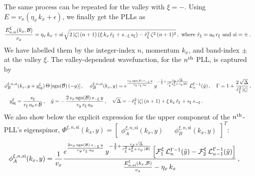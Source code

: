 \documentclass[aps,prb, onecolumn, nofootinbib, citeautoscript,10pt]{revtex4-2}
\def \nn{\nonumber \\}
\begin{document}
\begin{widetext}
The same process can be repeated for the valley with $\xi =- $. Using $E= v_x \left (  \eta_x \,   k_x + \epsilon   \right ) $, we finally get the PLLs as
\begin{align}
\frac{  E^{\xi}_{n, \rm{si}} (k_x, \mathcal B) } {v_x} =  
\eta_x \,   k_x + \text{si} \,\sqrt{ 2\,|\zeta|\,(n+1) \left (\xi\,k_x \, \tilde r_\xi + s_{-\xi} \, s_\xi \right ) - \tilde r_\xi^2 \, \zeta^2\,(n+1)^2 }  \,,
\text{ where } \tilde{r}_\xi = a_0 \, r_\xi \text{ and } \text{si} =\pm\,.
\end{align}
We have labelled them by the integer-index $n$, momentum $k_x$, and band-index $\pm$ at the valley $\xi$. The valley-dependent wavefunction, for the $n^{\rm th}$ PLL, is captured by
\begin{align}
& \phi_B^{\xi,n, \text{si}} (k_x, y+ y^\xi_{\rm sg}) \, \Theta \left[ \text{sgn}(\mathcal B ) \left(- y\right)  \right],\,
\quad
 \phi_B^{\xi, n, \text{si}} (k_x, y) = e^{\frac{ v_x \, \text{sgn} (\mathcal B) \,s_{- \xi}\, y} { v_y \, r_\xi\, a_0 }} \, 
y^{-\frac{1}{2}+{\frac{ v_x \,\sqrt{\Delta}}{ r_\xi^2\, a_0^2\, e  \, v_y  \left |{\mathcal B}  \right |}}} \, 
{\mathcal L}^{\Gamma-1}_{n}(\tilde y)\,, 
\quad  \Gamma = 1+ \frac{2 \,\sqrt{\Delta }}{\tilde  r_\xi^2 \, |\zeta|} \,,\nn
& \quad  y^\xi_{\rm sg} = \frac{s_\xi } {r_\xi \,a_0\,  e\, {\mathcal B}}\,,\quad
\tilde y = -\, \frac{ 2\, v_x \, \text{sgn} (\mathcal B) \,s_{-\xi}\, y} 
{ v_y \,r_\xi \, a_0 }\,, \quad
\sqrt{\Delta}=-{\tilde r}_\xi^2 \, |\zeta |\, (n+1) + \xi\,k_x \, {\tilde r}_\xi + s_{\xi} \, s_{-\xi} \,.
\end{align}
We also show below the explicit expression for the upper component of the $n^{\rm th}$-PLL's eigenspinor, $ \Phi^{\xi, n, \text{si}} (k_x, y) = \begin{bmatrix}
\phi_A^{\xi, n, \text{si}}  (k_x, y) && \phi_B^{\xi, n, \text{si}}  (k_x, y)  \end{bmatrix}^T $:
\begin{align}
\label{eqphia}
& \phi_A^{\xi, n, \text{si}} (k_x, y)  =  \frac{1}{v_x} \frac{
e^{\frac{2v_x \,\mathrm{sgn}(\mathcal{B})\, s_{-\xi}\, y}{v_y\, r_\xi\, a_0}}
\, y^{-\frac{3}{2} + 
\frac{v_x \sqrt{\Delta}}{r_{\xi}^2\, a_0^2\, e\, v_y\, \left|\mathcal{B}\right|}}
\left[
{\mathcal{F}}_1^\xi\,\mathcal{L}_{n}^{\Gamma-1}(\tilde{y})
-
{\mathcal{F}}_2^\xi \,\mathcal{L}_{n-1}^{\Gamma-1}(\tilde{y})\right]}
{ \frac{ E^{\xi}_{n, \rm{si}} (k_x, \mathcal B)} {v_x} - \eta_x \,   k_x }\,,

\end{align}
\end{widetext}
\end{document}
